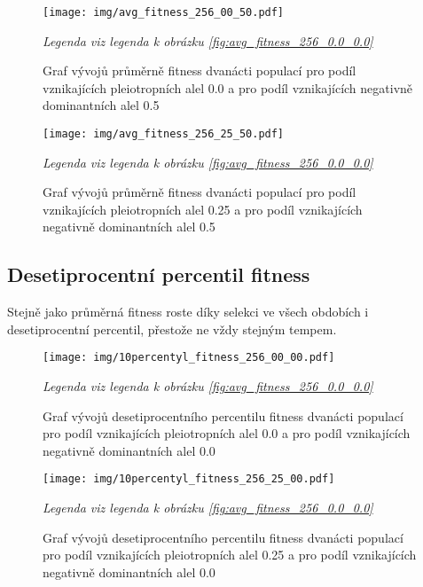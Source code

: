 \begin{figure}[H]
\caption{Graf vývojů průměrně fitness dvanácti populací pro podíl vznikajících pleiotropních alel 0.0 a pro podíl
    vznikajících negativně dominantních alel 0.5}
\centering
\texttt{[image: img/avg\_fitness\_256\_00\_50.pdf]}

\label{fig:avg_fitness_256_0.0_0.5}

\textit{Legenda viz legenda k obrázku \ref{fig:avg_fitness_256_0.0_0.0}}

\end{figure}

\begin{figure}[H]
\caption{Graf vývojů průměrně fitness dvanácti populací pro podíl vznikajících pleiotropních alel 0.25 a pro podíl
    vznikajících negativně dominantních alel 0.5}
\centering
\texttt{[image: img/avg\_fitness\_256\_25\_50.pdf]}

\label{fig:avg_fitness_256_0.25_0.5}

\textit{Legenda viz legenda k obrázku \ref{fig:avg_fitness_256_0.0_0.0}}

\end{figure}

\subsection{Desetiprocentní percentil fitness}

Stejně jako průměrná fitness roste díky selekci ve všech obdobích i desetiprocentní percentil,
přestože ne vždy stejným tempem.

\begin{figure}[H]
\caption{Graf vývojů desetiprocentního percentilu fitness dvanácti populací pro podíl vznikajících pleiotropních alel 0.0 a pro podíl
         vznikajících negativně dominantních alel 0.0}
\centering
\texttt{[image: img/10percentyl\_fitness\_256\_00\_00.pdf]}

\label{fig:10percentyl_fitness_256_0.0_0.0}

\textit{Legenda viz legenda k obrázku \ref{fig:avg_fitness_256_0.0_0.0}}

\end{figure}


\begin{figure}[H]
\caption{Graf vývojů desetiprocentního percentilu fitness dvanácti populací pro podíl vznikajících pleiotropních alel 0.25 a pro podíl
        vznikajících negativně dominantních alel 0.0}
\centering
\texttt{[image: img/10percentyl\_fitness\_256\_25\_00.pdf]}

\label{fig:10percentyl_fitness_256_0.25_0.0}

\textit{Legenda viz legenda k obrázku \ref{fig:avg_fitness_256_0.0_0.0}}

\end{figure}

